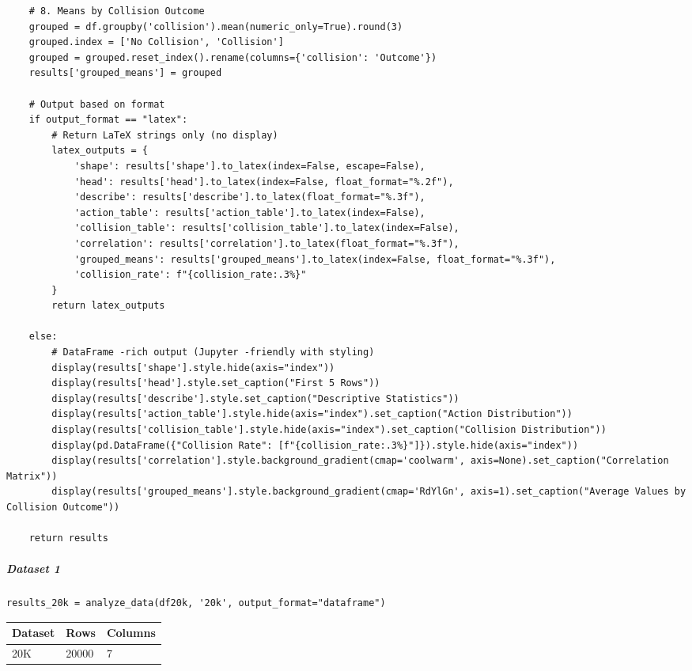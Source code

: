 \begin{verbatim}
    # 8. Means by Collision Outcome
    grouped = df.groupby('collision').mean(numeric_only=True).round(3)
    grouped.index = ['No Collision', 'Collision']
    grouped = grouped.reset_index().rename(columns={'collision': 'Outcome'})
    results['grouped_means'] = grouped
    
    # Output based on format
    if output_format == "latex":
        # Return LaTeX strings only (no display)
        latex_outputs = {
            'shape': results['shape'].to_latex(index=False, escape=False),
            'head': results['head'].to_latex(index=False, float_format="%.2f"),
            'describe': results['describe'].to_latex(float_format="%.3f"),
            'action_table': results['action_table'].to_latex(index=False),
            'collision_table': results['collision_table'].to_latex(index=False),
            'correlation': results['correlation'].to_latex(float_format="%.3f"),
            'grouped_means': results['grouped_means'].to_latex(index=False, float_format="%.3f"),
            'collision_rate': f"{collision_rate:.3%}"
        }
        return latex_outputs
    
    else:
        # DataFrame -rich output (Jupyter -friendly with styling)
        display(results['shape'].style.hide(axis="index"))
        display(results['head'].style.set_caption("First 5 Rows"))
        display(results['describe'].style.set_caption("Descriptive Statistics"))
        display(results['action_table'].style.hide(axis="index").set_caption("Action Distribution"))
        display(results['collision_table'].style.hide(axis="index").set_caption("Collision Distribution"))
        display(pd.DataFrame({"Collision Rate": [f"{collision_rate:.3%}"]}).style.hide(axis="index"))
        display(results['correlation'].style.background_gradient(cmap='coolwarm', axis=None).set_caption("Correlation Matrix"))
        display(results['grouped_means'].style.background_gradient(cmap='RdYlGn', axis=1).set_caption("Average Values by Collision Outcome"))
    
    return results
\end{verbatim}

\subparagraph{Dataset 1}

\begin{verbatim}
results_20k = analyze_data(df20k, '20k', output_format="dataframe")
\end{verbatim}

\bigskip\noindent
\begin{tabular}{p{}p{}p{}}
\toprule
Dataset & Rows & Columns \\
\hline
20K & 20000 & 7 \\
\bottomrule
\end{tabular}

